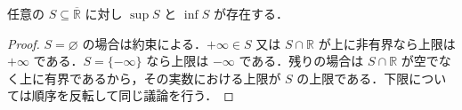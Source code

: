 \begin{prop}[拡大実数の順序完備性]
任意の $S\subseteq\overline{\mathbb R}$ に対し $\sup S$ と $\inf S$ が存在する．
\end{prop}
\begin{proof}
$S=\varnothing$ の場合は約束による．$+\infty\in S$ 又は $S\cap\mathbb R$ が上に非有界なら上限は $+\infty$ である．$S=\{-\infty\}$ なら上限は $-\infty$ である．残りの場合は $S\cap\mathbb R$ が空でなく上に有界であるから，その実数における上限が $S$ の上限である．下限については順序を反転して同じ議論を行う．
\end{proof}
